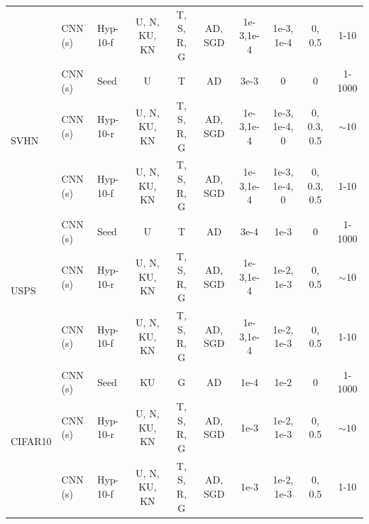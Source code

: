 \begin{table}[]
{{\begin{tabular}{@{}lllccccccc@{}}
                               & CNN (s) & Hyp-10-f    & U, N, KU, KN & T, S, R, G     & AD, SGD     & 1e-3,1e-4 & 1e-3, 1e-4      & 0, 0.5      & 1-10   \\
\cmidrule(r){1-1} \cmidrule(rl){2-2}  \cmidrule(rl){3-3} \cmidrule(rl){4-4} \cmidrule(rl){5-5}  \cmidrule(rl){6-6}  \cmidrule(rl){7-7}  \cmidrule(rl){8-8}  \cmidrule(rl){9-9} \cmidrule(rl){10-10} 
\multirow{3}{*}{SVHN}          & CNN (s) & Seed          & U              & T              & AD          & 3e-3      & 0             & 0           & 1-1000 \\
                               & CNN (s) & Hyp-10-r   & U, N, KU, KN & T, S, R, G     & AD, SGD     & 1e-3,1e-4 & 1e-3, 1e-4, 0 & 0, 0.3, 0.5 & $\sim 10$        \\
                               & CNN (s) & Hyp-10-f    & U, N, KU, KN & T, S, R, G     & AD, SGD     & 1e-3,1e-4 & 1e-3, 1e-4, 0 & 0, 0.3, 0.5 & 1-10   \\
\cmidrule(r){1-1} \cmidrule(rl){2-2}  \cmidrule(rl){3-3} \cmidrule(rl){4-4} \cmidrule(rl){5-5}  \cmidrule(rl){6-6}  \cmidrule(rl){7-7}  \cmidrule(rl){8-8}  \cmidrule(rl){9-9} \cmidrule(rl){10-10} 
\multirow{3}{*}{USPS}          & CNN (s) & Seed          & U              & T              & AD          & 3e-4      & 1e-3            & 0           & 1-1000 \\
                               & CNN (s) & Hyp-10-r   & U, N, KU, KN & T, S, R, G     & AD, SGD     & 1e-3,1e-4 & 1e-2, 1e-3      & 0, 0.5      & $\sim 10$        \\
                               & CNN (s) & Hyp-10-f    & U, N, KU, KN & T, S, R, G     & AD, SGD     & 1e-3,1e-4 & 1e-2, 1e-3      & 0, 0.5      & 1-10   \\
\cmidrule(r){1-1} \cmidrule(rl){2-2}  \cmidrule(rl){3-3} \cmidrule(rl){4-4} \cmidrule(rl){5-5}  \cmidrule(rl){6-6}  \cmidrule(rl){7-7}  \cmidrule(rl){8-8}  \cmidrule(rl){9-9} \cmidrule(rl){10-10} 
\multirow{3}{*}{CIFAR10}       & CNN (s) & Seed          & KU            & G              & AD          & 1e-4      & 1e-2            & 0           & 1-1000 \\
                               & CNN (s) & Hyp-10-r   & U, N, KU, KN & T, S, R, G     & AD, SGD     & 1e-3      & 1e-2, 1e-3      & 0, 0.5      & $\sim 10$        \\
                               & CNN (s) & Hyp-10-f    & U, N, KU, KN & T, S, R, G     & AD, SGD     & 1e-3      & 1e-2, 1e-3      & 0, 0.5      & 1-10   \\
\cmidrule(r){1-1} \cmidrule(rl){2-2}  \cmidrule(rl){3-3} \cmidrule(rl){4-4} \cmidrule(rl){5-5}  \cmidrule(rl){6-6}  \cmidrule(rl){7-7}  \cmidrule(rl){8-8}  \cmidrule(rl){9-9} \cmidrule(rl){10-10} 

\end{tabular}}}
\end{table}
